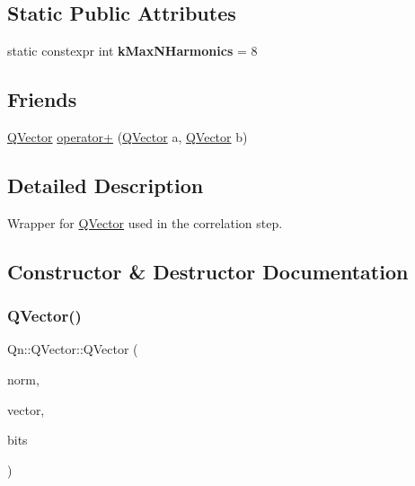 \subsection*{Static Public Attributes}
\begin{DoxyCompactItemize}
\item 
\mbox{\label{classQn_1_1QVector_ab304e10001ad079c54eb508a482831e4}} 
static constexpr int {\bfseries k\+Max\+N\+Harmonics} = 8
\end{DoxyCompactItemize}
\subsection*{Friends}
\begin{DoxyCompactItemize}
\item 
\mbox{\hyperlink{classQn_1_1QVector}{Q\+Vector}} \mbox{\hyperlink{classQn_1_1QVector_a49ad89498e27ff1c0f1a4bff592cb3b8}{operator+}} (\mbox{\hyperlink{classQn_1_1QVector}{Q\+Vector}} a, \mbox{\hyperlink{classQn_1_1QVector}{Q\+Vector}} b)
\end{DoxyCompactItemize}


\subsection{Detailed Description}
Wrapper for \mbox{\hyperlink{classQn_1_1QVector}{Q\+Vector}} used in the correlation step. 

\subsection{Constructor \& Destructor Documentation}
\mbox{\label{classQn_1_1QVector_a80ff6af623f822375fec45644b66e17d}} 
\subsubsection{\texorpdfstring{Q\+Vector()}{QVector()}}
{\footnotesize\ttfamily Qn\+::\+Q\+Vector\+::\+Q\+Vector (\begin{DoxyParamCaption}\item[{\mbox{\hyperlink{classQn_1_1CorrectionQnVector_a2998fe4babb716c57848c8c73b24a398}{Q\+Vector\+::\+Normalization}}}]{norm,  }\item[{const \mbox{\hyperlink{classQn_1_1CorrectionQnVector}{Correction\+Qn\+Vector}} $\ast$}]{vector,  }\item[{std\+::bitset$<$ k\+Max\+N\+Harmonics $>$}]{bits }\end{DoxyParamCaption})}


